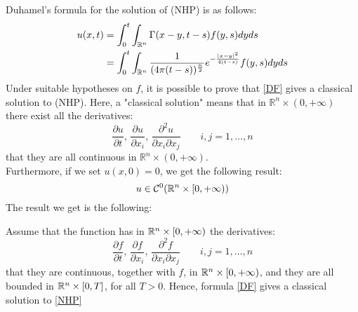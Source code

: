 Duhamel's formula for the solution of (NHP) is as follows:
\begin{equation}\label{DF}
    \begin{split}
        u(x,t) &= \int_0^t \int_{\mathbb{R}^n} \Gamma(x-y,t-s) f(y,s) dyds \\
        &= \int_0^t \int_{\mathbb{R}^n} \frac{1}{(4 \pi (t-s))^{\frac{n}{2}}} e^{-\frac{|x-y|^2}{4(t-s)}} f(y,s) dyds 
    \end{split}
\end{equation}
Under suitable hypotheses on \( f \), it is possible to prove that \eqref{DF} gives a classical solution to (NHP). Here, a "classical solution" means that in \( \mathbb{R}^n \times (0, +\infty) \) there exist all the derivatives:
\begin{equation*}
    \frac{\partial u}{\partial t}, \, \frac{\partial u}{\partial x_i},\, \frac{\partial^2 u}{\partial x_i \partial x_j} \qquad i,j= 1, \dots, n
\end{equation*}
that they are all continuous in \( \mathbb{R}^n \times (0, +\infty) \).\\ 
Furthermore, if we set \( u(x,0) = 0 \), we get the following result:
\begin{equation*}
    u \in \mathcal{C}^0 (\mathbb{R}^n \times [0, +\infty))
\end{equation*}
The result we get is the following:
\begin{ThBox}
    \begin{Th}
    Assume that the function has in $\mathbb{R}^n \times [0, + \infty)$ the derivatives:
    \begin{equation*}
    \frac{\partial f}{\partial t}, \, \frac{\partial f}{\partial x_i},\, \frac{\partial^2 f}{\partial x_i \partial x_j} \qquad i,j= 1, \dots, n
\end{equation*}
that they are continuous, together with $f$, in $\mathbb{R}^n \times [0, +\infty)$, and they are all bounded in $\mathbb{R}^n \times [0, T]$, for all $T>0$. Hence, formula \eqref{DF} gives a classical solution to \eqref{NHP}
\end{Th}
\end{ThBox}
